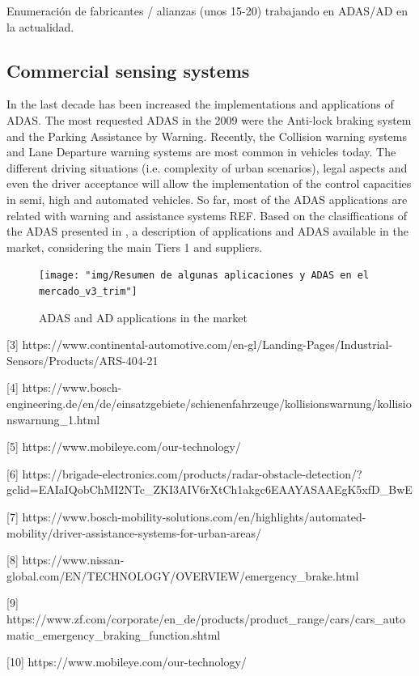 
Enumeración de fabricantes / alianzas (unos 15-20) trabajando en ADAS/AD en la actualidad.

\subsection{Commercial sensing systems}

In the last decade has been increased the implementations and applications of 
ADAS. The most requested ADAS in the 2009 \cite{Frost&Sullivan2010}
were the Anti-lock braking system and the Parking Assistance by Warning. 
Recently, the Collision warning systems and Lane Departure warning systems are 
most common in vehicles today. The different driving situations (i.e. 
complexity of urban scenarios), legal aspects and even the driver acceptance 
will allow the implementation of the control capacities in semi, high and 
automated vehicles. So far, most of the ADAS applications are related with 
warning and assistance systems REF. Based on the clasiffications of the ADAS 
presented in \cite{Perez2016}, a description of applications and ADAS 
available 
in the market, considering the main Tiers 1 and suppliers.    

\begin{figure}[h]
    \centering
    \texttt{[image: "img/Resumen de algunas aplicaciones 
    y ADAS en el mercado\_v3\_trim"]}
    \caption{ADAS and AD applications in the market}
    \label{fig:adas-apps}
\end{figure}

[3] 
https://www.continental-automotive.com/en-gl/Landing-Pages/Industrial-Sensors/Products/ARS-404-21

[4] 
https://www.bosch-engineering.de/en/de/einsatzgebiete/schienenfahrzeuge/kollisionswarnung/kollisionswarnung\_1.html

[5] https://www.mobileye.com/our-technology/

[6] 
https://brigade-electronics.com/products/radar-obstacle-detection/?gclid=EAIaIQobChMI2NTc\_ZKI3AIV6rXtCh1akgc6EAAYASAAEgK5xfD\_BwE

[7] 
https://www.bosch-mobility-solutions.com/en/highlights/automated-mobility/driver-assistance-systems-for-urban-areas/

[8] https://www.nissan-global.com/EN/TECHNOLOGY/OVERVIEW/emergency\_brake.html

[9] 
https://www.zf.com/corporate/en\_de/products/product\_range/cars/cars\_automatic\_emergency\_braking\_function.shtml

[10] https://www.mobileye.com/our-technology/

